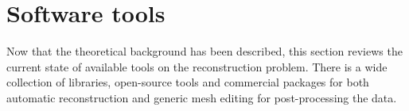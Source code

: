 \section{Software tools}

Now that the theoretical background has been described, this section reviews the current state of available tools on the reconstruction problem. There is a wide collection of libraries, open-source tools and commercial packages for both automatic reconstruction and generic mesh editing for post-processing the data.
